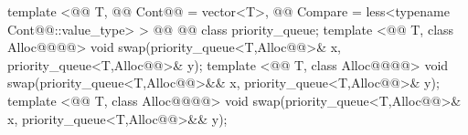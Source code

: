 \documentclass[american,twoside]{book}
\begin{document}
\begin{codeblock}
{  template <@@ T, @@ Cont@@ = vector<T>,
        @@ Compare = less<typename Cont@@::value_type> >
    @@
             @@
  class priority_queue;
  template <@@ T, class Alloc@@@@>
    void swap(priority_queue<T,Alloc@@>& x, priority_queue<T,Alloc@@>& y);
  template <@@ T, class Alloc@@@@>
    void swap(priority_queue<T,Alloc@@>&& x, priority_queue<T,Alloc@@>& y);
  template <@@ T, class Alloc@@@@>
    void swap(priority_queue<T,Alloc@@>& x, priority_queue<T,Alloc@@>&& y);
}
\end{codeblock}

%
\end{document}

